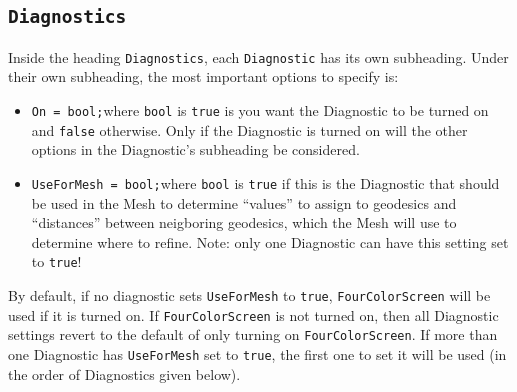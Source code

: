 \documentclass[11pt,a4paper]{article}
\newcommand{\code}[1]{{\tt #1}}
\begin{document}
\subsection{\code{Diagnostics}}
Inside the heading \code{Diagnostics}, each \code{Diagnostic} has its own subheading. Under their own subheading, the most important options to specify is:
\begin{itemize}
 \item \code{On = bool;}\newline where \code{bool} is \code{true} is you want the Diagnostic to be turned on and \code{false} otherwise. Only if the Diagnostic is turned on will the other options in the Diagnostic's subheading be considered.
 \item \code{UseForMesh = bool;}\newline where \code{bool} is \code{true} if this is the Diagnostic that should be used in the Mesh to determine ``values'' to assign to geodesics and ``distances'' between neigboring geodesics, which the Mesh will use to determine where to refine. Note: only one Diagnostic can have this setting set to \code{true}!
\end{itemize}
By default, if no diagnostic sets \code{UseForMesh} to \code{true}, \code{FourColorScreen} will be used if it is turned on. If \code{FourColorScreen} is not turned on, then all Diagnostic settings revert to the default of only turning on \code{FourColorScreen}. If more than one Diagnostic has \code{UseForMesh} set to \code{true}, the first one to set it will be used (in the order of Diagnostics given below).
\end{document}
